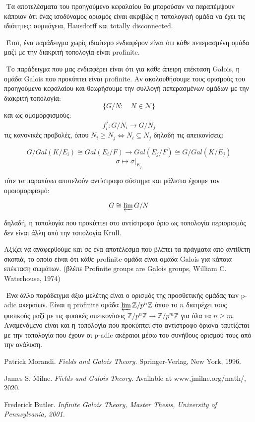 \documentclass[oneside,a4paper]{article}
\newcommand {\tl}{\textlatin}
\begin{document}
$ $\newline
\noindent Τα αποτελέσματα του προηγούμενο κεφαλαίου θα μπορούσαν να παραπέμψουν κάποιον ότι ένας ισοδύναμος ορισμός είναι ακριβώς η τοπολογική ομάδα να έχει τις ιδιότητες: συμπάγεια, \tl{Hausdorff} και \tl{totally disconnected}.

$ $\newline
\noindent Έτσι, ένα παράδειγμα χωρίς ιδιαίτερο ενδιαφέρον είναι ότι κάθε πεπερασμένη ομάδα μαζί με την διακριτή τοπολογία είναι \tl{profinite}.

$ $\newline
\noindent Το παράδειγμα που μας ενδιαφέρει είναι ότι για κάθε άπειρη επέκταση \tl{Galois}, η ομάδα \tl{Galois} που προκύπτει είναι \tl{profinite}. Αν ακολουθήσουμε τους ορισμούς του προηγούμενο κεφαλαίου και θεωρήσουμε την συλλογή πεπερασμένων ομάδων με την διακριτή τοπολογία:
$$\{G/N: \quad N \in \mathcal{N}\}$$
και ως ομομορφισμούς:
$$f^j_i : G/N_i \longrightarrow G/N_j$$
τις κανονικές προβολές, όπου $N_i \geq N_j \iff N_i \subseteq N_j$
δηλαδή τις απεικονίσεις:

$$G/Gal(K/E_i) \cong Gal(E_i /F) \longrightarrow Gal(E_j /F) \cong G/Gal(K/E_j)$$
$$\sigma \longmapsto \sigma|_{E_j}$$

\noindent τότε τα παραπάνω αποτελούν αντίστροφο σύστημα και μάλιστα έχουμε τον ομοιομορφισμό:

$$G \cong \varprojlim G/N$$

\noindent δηλαδή, η τοπολογία που προκύπτει στο αντίστροφο όριο ως τοπολογία περιορισμός δεν είναι άλλη από την τοπολογία \tl{Krull}.

\noindent Αξίζει να αναφερθούμε και σε ένα αποτέλεσμα που βλέπει τα πράγματα από αντίθετη σκοπιά, το οποίο είναι ότι κάθε \tl{profinite} ομάδα είναι ομάδα \tl{Galois} για κάποια επέκταση σωμάτων. (βλέπε \tl{Profinite groups are Galois groups, William C. Waterhouse, 1974})

$ $\newline
Ένα άλλο παράδειγμα άξιο μελέτης είναι ο ορισμός της προσθετικής ομάδας των \tl{p-adic} ακεραίων. Είναι η profinite ομάδα $\varprojlim \mathbb{Z}/p^n \mathbb{Z}$ όπου το $n$ διατρέχει τους φυσικούς μαζί με τις φυσικές απεικονίσεις $\mathbb{Z}/p^n \mathbb{Z} \rightarrow \mathbb{Z}/p^m \mathbb{Z}$ για όλα τα $n\geq m$. Αναμενόμενο είναι και η τοπολογία που προκύπτει στο αντίστροφο όριονα ταυτίζεται με την τοπολογία που έχουν οι \tl{p-adic} ακέραιοι μέσω του συνήθους ορισμού τους από την ανάλυση.

\pagebreak

\begin{thebibliography}{9}
	\tl{Patrick Morandi.}
	\textit{\tl{Fields and Galois Theory.}}
	\tl{Springer-Verlag, New York, 1996.}

	\tl{James S. Milne.}
	\textit{\tl{Fields and Galois Theory.}}
	\tl{Available at www.jmilne.org/math/, 2020.}

	\tl{Frederick Butler.}
	\textit{\tl{Infinite Galois Theory, Master Thesis, University of Pennsylvania, 2001.}}
\end{thebibliography}

%
\end{document}
